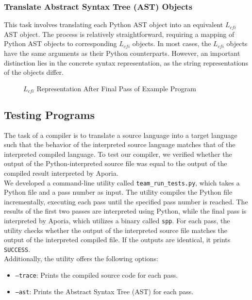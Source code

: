 \subsubsection{Translate Abstract Syntax Tree (AST) Objects}
This task involves translating each Python AST object into an equivalent $L_{cfi}$ AST object. The process is relatively straightforward, requiring a mapping of Python AST objects to corresponding $L_{cfi}$ objects. In most cases, the $L_{cfi}$ objects have the same arguments as their Python counterparts. However, an important distinction lies in the concrete syntax representation, as the string representations of the objects differ.

\begin{figure}[h!]
	
	\caption{$L_{cfi}$ Representation After Final Pass of Example Program}
	\label{code:lcfi}
\end{figure}

\subsection{Testing Programs}

The task of a compiler is to translate a source language into a target language such that the behavior of the interpreted source language matches that of the interpreted compiled language. To test our compiler, we verified whether the output of the Python-interpreted source file was equal to the output of the compiled result interpreted by Aporia.
\\

We developed a command-line utility called \texttt{team\_run\_tests.py}, which takes a Python file and a pass number as input. The utility compiles the Python file incrementally, executing each pass until the specified pass number is reached. The results of the first two passes are interpreted using Python, while the final pass is interpreted by Aporia, which utilizes a binary called \texttt{spp}. For each pass, the utility checks whether the output of the interpreted source file matches the output of the interpreted compiled file. If the outputs are identical, it prints \texttt{SUCCESS}.
\\

Additionally, the utility offers the following options:
\begin{itemize}
	\item \texttt{--trace}: Prints the compiled source code for each pass.
	\item \texttt{--ast}: Prints the Abstract Syntax Tree (AST) for each pass.
\end{itemize}
\\

